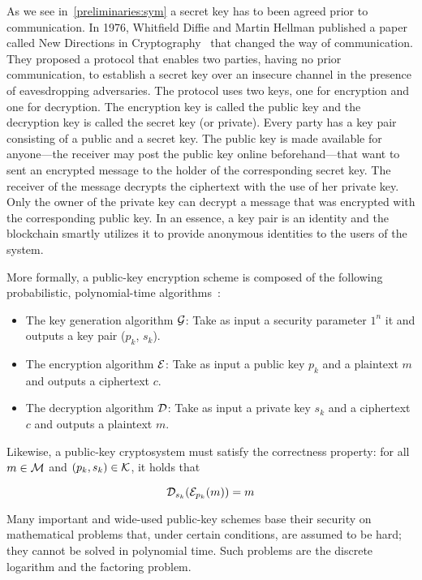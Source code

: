 As we see in~\ref{preliminaries:sym} a secret key has to been agreed prior to communication. In 1976, Whitfield Diffie and Martin Hellman published a paper called New Directions in Cryptography~\cite{Diffie:2006:NDC:2263321.2269104} that changed the way of communication. They proposed a protocol that enables two parties, having no prior communication, to establish a secret key over an insecure channel in the presence of eavesdropping adversaries. The protocol uses two keys, one for encryption and one for decryption. The encryption key is called the public key and the decryption key is called the secret key (or private). Every party has a key pair consisting of a public and a secret key. The public key is made available for anyone---the receiver may post the public key online beforehand---that want to sent an encrypted message to the holder of the corresponding secret key. The receiver of the message decrypts the ciphertext with the use of her private key. Only the owner of the private key can decrypt a message that was encrypted with the corresponding public key. In an essence, a key pair is an identity and the blockchain smartly utilizes it to provide anonymous identities to the users of the system.

More formally, a public-key encryption scheme is composed of the following probabilistic, polynomial-time algorithms~\cite{Katz:2014:IMC:2700550, kiagias:crypto}:

\begin{itemize}
  \item The key generation algorithm $\mathcal{G}$: Take as input a security parameter $1^{n}$ it and outputs a key pair ($p_k$, $s_k$).
  \item The encryption algorithm $\mathcal{E}$: Take as input a public key $p_k$ and a plaintext $m$ and outputs a ciphertext $c$.
  \item The decryption algorithm $\mathcal{D}$: Take as input a private key $s_k$ and a ciphertext $c$ and outputs a plaintext $m$.
\end{itemize}

Likewise, a public-key cryptosystem must satisfy the correctness property: for all $m \in \mathcal{M}$ and $(p_k, s_k) \in \mathcal{K}$, it holds that

\begin{equation*}
  \mathcal{D}_{s_k}(\mathcal{E}_{p_k}(m)) = m
\end{equation*}

Many important and wide-used public-key schemes base their security on mathematical problems that, under certain conditions, are assumed to be hard; they cannot be solved in polynomial time. Such problems are the discrete logarithm and the factoring problem.

